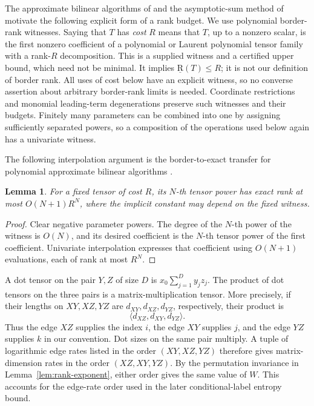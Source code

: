 \documentclass[11pt]{article}
\numberwithin{equation}{section}
\newtheorem{lemma}[theorem]{Lemma}
\theoremstyle{definition}
\theoremstyle{remark}
\begin{document}
The approximate bilinear algorithms of \citet{bini} and the
asymptotic-sum method of \citet{schonhage} motivate the following
explicit form of a rank budget.  We use polynomial border-rank witnesses.
Saying that \(T\) has \emph{cost} \(R\) means that \(T\), up to a nonzero
scalar, is the first nonzero coefficient of a polynomial or Laurent
polynomial tensor family with a rank-\(R\) decomposition.
This is a supplied witness and a certified upper bound, which need not
be minimal.  It implies \(\operatorname{\underline R}(T)\le R\); it is not our definition of
border rank.  All uses of cost below have an explicit witness, so no
converse assertion about arbitrary border-rank limits is needed.
Coordinate restrictions and monomial leading-term degenerations preserve
such witnesses and their budgets.  Finitely many parameters can be
combined into one by assigning sufficiently separated powers, so a
composition of the operations used below again has a univariate witness.

The following interpolation argument is the border-to-exact transfer
for polynomial approximate bilinear algorithms \cite{bini}.

\begin{lemma}\label{lem:border-overhead}
For a fixed tensor of cost \(R\), its \(N\)-th tensor power has exact
rank at most \(O(N+1)R^N\), where the implicit constant may depend on
the fixed witness.
\end{lemma}

\begin{proof}
Clear negative parameter powers.
The degree of the \(N\)-th power of the witness is \(O(N)\), and its
desired coefficient is the \(N\)-th tensor power of the first
coefficient.  Univariate interpolation expresses that coefficient using
\(O(N+1)\) evaluations, each of rank at most \(R^N\).
\end{proof}

A dot tensor on the pair \(Y,Z\) of size \(D\) is
\(x_0\sum_{j=1}^D y_jz_j\).
The product of dot tensors on the three pairs is a matrix-multiplication
tensor.  More precisely, if their lengths on \(XY,XZ,YZ\) are
\(d_{XY},d_{XZ},d_{YZ}\), respectively, their product is
\[
 \langle d_{XZ},d_{XY},d_{YZ}\rangle.
\]
Thus the edge \(XZ\) supplies the index \(i\), the edge \(XY\)
supplies \(j\), and the edge \(YZ\) supplies \(k\) in our convention.
Dot sizes on the same pair multiply.  A tuple of logarithmic edge rates
listed in the order \((XY,XZ,YZ)\) therefore gives matrix-dimension
rates in the order \((XZ,XY,YZ)\).  By the permutation invariance in
Lemma~\ref{lem:rank-exponent}, either order gives the same value of
\(W\).  This accounts for the edge-rate order used in the later
conditional-label entropy bound.
\end{document}
